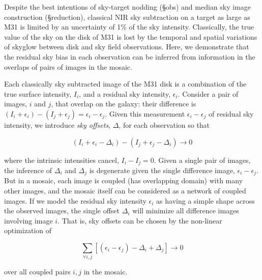 \documentclass[iop]{emulateapj}
\begin{document}
Despite the best intentions of sky-target nodding (\S obs) and median sky image construction (\S reduction), classical NIR sky subtraction on a target as large as M31 is limited by an uncertainty of 1\% of the sky intensity. Classically, the true value of the sky on the disk of M31 is lost by the temporal and spatial variations of skyglow between disk and sky field observations. Here, we demonstrate that the residual sky bias in each observation can be inferred from information in the overlaps of pairs of images in the mosaic.

Each classically sky subtracted image of the M31 disk is a combination of the true surface intensity, $I_i$, and a residual sky intensity, $\epsilon_i$. Consider a pair of images, $i$ and $j$, that overlap on the galaxy: their difference is $(I_i+\epsilon_i) - (I_j+\epsilon_j) = \epsilon_i - \epsilon_j$. Given this measurement $\epsilon_i - \epsilon_j$ of residual sky intensity, we introduce \emph{sky offsets}, $\Delta$, for each observation so that

\begin{equation}
    (I_i + \epsilon_i - \Delta_i) - (I_j + \epsilon_j - \Delta_i) \rightarrow 0
\end{equation}

\noindent where the intrinsic intensities cancel, $I_i - I_j = 0$. Given a single pair of images, the inference of $\Delta_i$ and $\Delta_j$ is degenerate given the single difference image, $\epsilon_i-\epsilon_j$. But in a mosaic, each image is coupled (has overlapping domain) with many other images, and the mosaic itself can be considered as a network of coupled images. If we model the residual sky intensity $\epsilon_i$ as having a simple shape across the observed images, the single offset $\Delta_i$ will minimize all difference images involving image $i$. That is, sky offsets can be chosen by the non-linear optimization of

\begin{equation}
    \sum_{\forall i,j} [(\epsilon_i - \epsilon_j) - \Delta_i + \Delta_j] \rightarrow 0
    \label{eq:scalartheoryobj}
\end{equation}

\noindent over all coupled pairs $i,j$ in the mosaic.
\end{document}
